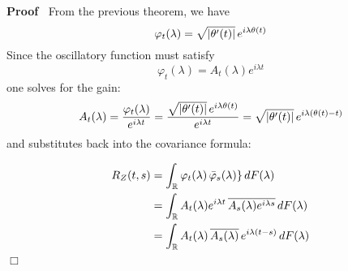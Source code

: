 \documentclass{article}
\newenvironment{proof}{\noindent\textbf{Proof\ }}{\hspace*{\fill}$\Box$\medskip}
\begin{document}
\begin{proof}
  From the previous theorem, we have
  \begin{equation}
    \varphi_t (\lambda) = \sqrt{| \theta' (t) |}  \hspace{0.17em} e^{i \lambda
    \theta (t)}
  \end{equation}
  Since the oscillatory function must satisfy
  \begin{equation}
    \varphi_t (\lambda) = A_t (\lambda) e^{i \lambda t}
  \end{equation}
  one solves for the gain:
  \[ A_t (\lambda) = \frac{\varphi_t (\lambda)}{e^{i \lambda t}} =
     \frac{\sqrt{| \theta' (t) |}  \hspace{0.17em} e^{i \lambda \theta
     (t)}}{e^{i \lambda t}} = \sqrt{| \theta' (t) |}  \hspace{0.17em} e^{i
     \lambda (\theta (t) - t)} \]
  and substitutes back into the covariance formula:
  
  \begin{align}
    R_Z (t, s) & = \int_{\mathbb{R}} \varphi_t (\lambda)  \hspace{0.17em}
    \bar{\varphi}_s (\lambda) \} \hspace{0.17em} dF (\lambda) \\
    & = \int_{\mathbb{R}} A_t (\lambda) e^{i \lambda t} \hspace{0.17em}
    \overline{A_s (\lambda) e^{i \lambda s}} \hspace{0.17em} dF (\lambda) \\
    & = \int_{\mathbb{R}} A_t (\lambda) \hspace{0.17em} \overline{A_s
    (\lambda)} \hspace{0.17em} e^{i \lambda (t - s)}  \hspace{0.17em} dF
    (\lambda) 
  \end{align}
\end{proof}
\end{document}
